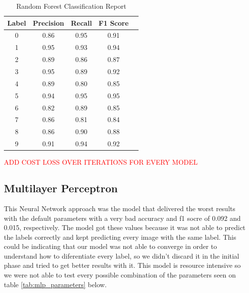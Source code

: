 \documentclass[conference]{IEEEtran}
\begin{document}
\begin{table}[!h]
    \centering
    \begin{tabular}{|c|c|c|c|r|}
        \hline
        \textbf{Label} & \textbf{Precision} & \textbf{Recall} & \textbf{F1 Score} \\ \hline
        0              & 0.86               & 0.95            & 0.91              \\ \hline
        1              & 0.95               & 0.93            & 0.94              \\ \hline
        2              & 0.89               & 0.86            & 0.87              \\ \hline
        3              & 0.95               & 0.89            & 0.92              \\ \hline
        4              & 0.89               & 0.80            & 0.85              \\ \hline
        5              & 0.94               & 0.95            & 0.95              \\ \hline
        6              & 0.82               & 0.89            & 0.85              \\ \hline
        7              & 0.86               & 0.81            & 0.84              \\ \hline
        8              & 0.86               & 0.90            & 0.88              \\ \hline
        9              & 0.91               & 0.94            & 0.92              \\ \hline
    \end{tabular}
    \label{tab:rfc_classification_report}
    \caption{Random Forest Classification Report}
\end{table}

\textcolor{red}{ADD COST LOSS OVER ITERATIONS FOR EVERY MODEL}

\subsection{Multilayer Perceptron}
This Neural Network approach was the model that delivered the worst results with the default parameters with a very bad accuracy and f1 socre of 0.092 and 0.015, respectively.
The model got these values because it was not able to predict the labels correctly and kept predicting every image with the same label. This could be indicating that our model was not able to converge in order to understand how to diferentiate every label,
so we didn't discard it in the initial phase and tried to get better results with it.
This model is resource intensive so we were not able to test every possible combination of the parameters seen on table \ref{tab:mlp_parameters} below.
\end{document}
